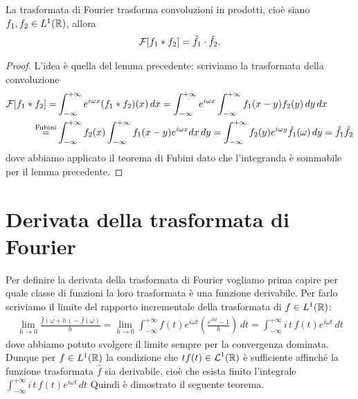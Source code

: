 \begin{theorem}[  ]
  La trasformata di Fourier trasforma convoluzioni in prodotti, cioè siano $ f_1, f_2 \in L^1(\R) $, allora 
  \begin{align}
    \F[f_1*f_2] = \hat{f}_1 \cdot \hat{f}_2.
  \end{align}
\end{theorem}
\begin{proof}
  L'idea è quella del lemma precedente: scriviamo la trasformata della convoluzione
  \begin{align}
    \F[f_1*f_2] = &\int_{-\infty}^{+\infty} e^{i\omega x}(f_1*f_2)(x)  \,dx
    = \int_{-\infty}^{+\infty} e^{i\omega x} \int_{-\infty}^{+\infty} f_1(x - y)f_2(y) \, dy \,dx 
    \\
    \ov{=}{\textnormal{Fubini}} &\int_{-\infty}^{+\infty} {f_2(x)} \int_{-\infty}^{+\infty} {f_1(x - y)} e^{i\omega x} dx \, dy 
    = \int_{-\infty}^{+\infty} {f_2(y)} e^{i\omega y} \hat{f}_1(\omega) \, dy = \hat{f}_1 \hat{f}_2
  \end{align}
  dove abbiamo applicato il teorema di Fubini dato che l'integranda è sommabile per il lemma precedente.
\end{proof}

\section{Derivata della trasformata di Fourier}

Per definire la derivata della trasformata di Fourier vogliamo prima capire per quale classe di funzioni la loro trasformata è una funzione derivabile.
Per farlo scriviamo il limite del rapporto incrementale della trasformata di $ f \in L^1(\R) $:
\begin{align}
  \lim_{h\to 0} \frac{\hat{f}(\omega + h) - \hat{f}(\omega)}{h} 
  = \lim_{h\to0} \int_{-\infty}^{+\infty} f(t) e^{i\omega t} \left( \frac{e^{iht} - 1 }{h}\right) \, dt 
  = \int_{-\infty}^{+\infty} i\,t\,f(t) e^{i\omega t} \, dt 
\end{align}
dove abbiamo potuto svolgere il limite sempre per la convergenza dominata. Dunque per $ f \in L^1(\R) $ la condizione che $ t f(t)\in \L^1(\R) $ 
è sufficiente affinché la funzione trasformata $ \hat{f} $ sia derivabile, cioè che esista finito l'integrale 
$ \int_{-\infty}^{+\infty} i\,t\,f(t) e^{i\omega t} \, dt $
Quindi è dimostrato il seguente teorema.

